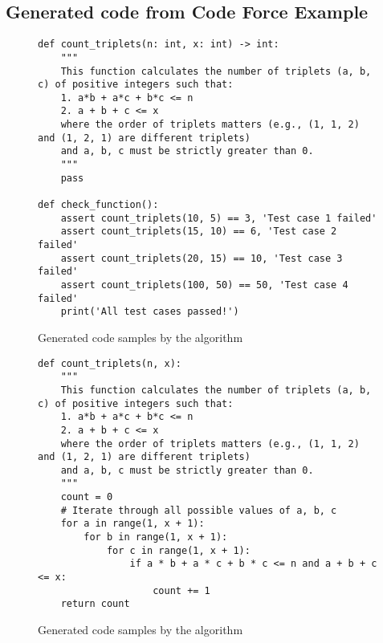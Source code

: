 \subsection{Generated code from Code Force Example}
\label{code_force_generated_code}
\begin{figure}[H]
\centering
    \begin{lstlisting}
def count_triplets(n: int, x: int) -> int:
    """
    This function calculates the number of triplets (a, b, c) of positive integers such that:
    1. a*b + a*c + b*c <= n
    2. a + b + c <= x
    where the order of triplets matters (e.g., (1, 1, 2) and (1, 2, 1) are different triplets) 
    and a, b, c must be strictly greater than 0.
    """
    pass

def check_function():
    assert count_triplets(10, 5) == 3, 'Test case 1 failed'
    assert count_triplets(15, 10) == 6, 'Test case 2 failed'
    assert count_triplets(20, 15) == 10, 'Test case 3 failed'
    assert count_triplets(100, 50) == 50, 'Test case 4 failed'
    print('All test cases passed!')
    \end{lstlisting}

\caption{Generated code samples by the algorithm}
\end{figure}

\begin{figure}[H]
\centering
    \begin{lstlisting}
def count_triplets(n, x):
    """
    This function calculates the number of triplets (a, b, c) of positive integers such that:
    1. a*b + a*c + b*c <= n
    2. a + b + c <= x
    where the order of triplets matters (e.g., (1, 1, 2) and (1, 2, 1) are different triplets) 
    and a, b, c must be strictly greater than 0.
    """
    count = 0
    # Iterate through all possible values of a, b, c
    for a in range(1, x + 1):
        for b in range(1, x + 1):
            for c in range(1, x + 1):
                if a * b + a * c + b * c <= n and a + b + c <= x:
                    count += 1
    return count 
    \end{lstlisting}

\caption{Generated code samples by the algorithm}
\end{figure}

